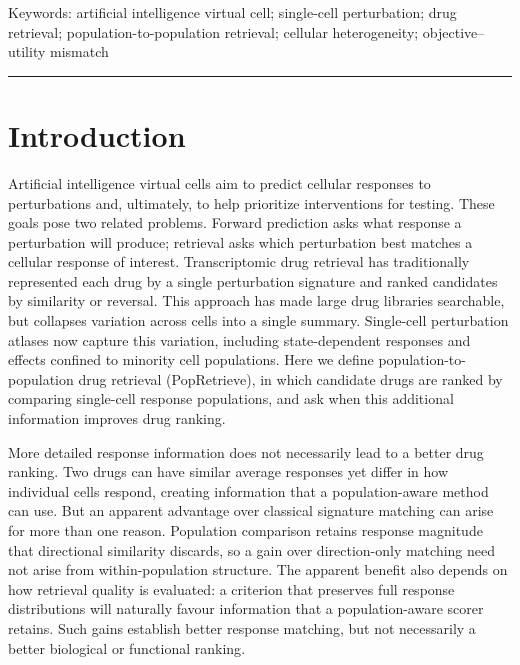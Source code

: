 \documentclass[11pt,letterpaper]{article}
\begin{document}
Keywords: artificial intelligence virtual cell; single-cell perturbation; drug retrieval; population-to-population retrieval; cellular heterogeneity; objective--utility mismatch


\bigskip\noindent\rule{\textwidth}{0.4pt}\bigskip

\section*{Introduction}

Artificial intelligence virtual cells\cite{AIVirtualCell,VirtualCellChallenge} aim to predict cellular responses to perturbations\cite{ref7,ref8,ref9} and, ultimately, to help prioritize interventions for testing. These goals pose two related problems. Forward prediction asks what response a perturbation will produce\cite{ref4,ref5,ref6,ref10}; retrieval asks which perturbation best matches a cellular response of interest\cite{ref12}. Transcriptomic drug retrieval has traditionally represented each drug by a single perturbation signature and ranked candidates by similarity or reversal\cite{ref1,ref2}. This approach has made large drug libraries searchable, but collapses variation across cells into a single summary. Single-cell perturbation atlases now capture this variation\cite{ref3,dataSciPlex3,Tahoe100M}, including state-dependent responses\cite{dataZhao} and effects confined to minority cell populations\cite{RareCellVariability}. Here we define population-to-population drug retrieval (PopRetrieve), in which candidate drugs are ranked by comparing single-cell response populations, and ask when this additional information improves drug ranking.

More detailed response information does not necessarily lead to a better drug ranking. Two drugs can have similar average responses yet differ in how individual cells respond, creating information that a population-aware method can use. But an apparent advantage over classical signature matching can arise for more than one reason. Population comparison retains response magnitude that directional similarity discards, so a gain over direction-only matching need not arise from within-population structure. The apparent benefit also depends on how retrieval quality is evaluated: a criterion that preserves full response distributions\cite{OptimalMetrics,StandardizedEval} will naturally favour information that a population-aware scorer retains\cite{CellOT,CellFlow,Departures}. Such gains establish better response matching, but not necessarily a better biological or functional ranking\cite{ref13,ref14,ref15,ref16,MetricGaming}.
\end{document}

